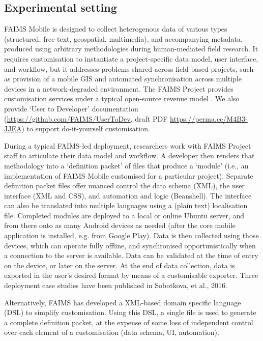 \documentclass[preprint,12pt, a4paper]{elsarticle}
\begin{document}
\subsection{Experimental setting}


FAIMS Mobile is designed to collect heterogenous data of various types (structured, free text, geospatial, multimedia), and accompanying metadata, produced using arbitrary methodologies during human-mediated field research. It requires customisation to instantiate a project-specific data model, user interface, and workflow, but it addresses problems shared across field-based projects, such as provision of a mobile GIS and automated synchronisation across multiple devices in a network-degraded environment. The FAIMS Project provides customisation services under a typical open-source revenue model \cite{Kelly2008-sb}. We also provide ‘User to Developer’ documentation (\url{https://github.com/FAIMS/UserToDev}, draft PDF \url{https://perma.cc/M4B3-JJEA}) to support do-it-yourself customisation.

During a typical FAIMS-led deployment, researchers work with FAIMS Project staff to articulate their data model and workflow. A developer then renders that methodology into a ‘definition packet’ of files that produce a ‘module’ (i.e., an implementation of FAIMS Mobile customised for a particular project). Separate definition packet files offer nuanced control the data schema (XML), the user interface (XML and CSS), and automation and logic (Beanshell). The interface can also be translated into multiple languages using a (plain text) localisation file. Completed modules are deployed to a local or online Ubuntu server, and from there onto as many Android devices as needed (after the core mobile application is installed, e.g. from Google Play). Data is then collected using those devices, which can operate fully offline, and synchronised opportunistically when a connection to the server is available. Data can be validated at the time of entry on the device, or later on the server. At the end of data collection, data is exported in the user’s desired format by means of a customisable exporter. Three deployment case studies have been published in Sobotkova, et al., 2016\cite{Sobotkova2016-mx}.

Alternatively, FAIMS has developed a XML-based domain specific language (DSL) to simplify customisation. Using this DSL, a single file is used to generate a complete definition packet, at the expense of some loss of independent control over each element of a customisation (data schema, UI, automation). 
\end{document}
